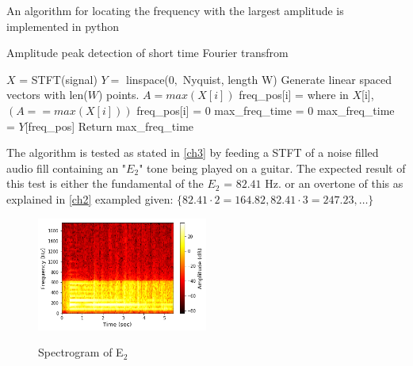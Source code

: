 An algorithm for locating the frequency with the largest amplitude  is implemented in python 
\begin{algorithm}[H]
\caption{Amplitude peak detection of short time Fourier transfrom}
\label{alg:FIR}
\begin{algorithmic}[1] 
\State  $X$ = STFT(signal) 
\State $Y =$ linspace($0,$ Nyquist, length W) \Comment Generate linear spaced vectors with len($W$) points.
		\State $A = max(X[i])$ 
		 
			\State freq\_pos[i] = where in $X$[i], $(A == max(X[i]))$ 
		\Else
			\State freq\_pos[i] = 0	
		\EndIf
			\State max\_freq\_time = 0
		\Else
			\State max\_freq\_time = $Y$[freq\_pos]
		\EndIf
	\EndFor
	\State Return max\_freq\_time
\EndProcedure
\end{algorithmic}
\end{algorithm}

The algorithm is tested as stated in \ref{ch3}  by feeding  a STFT of a noise filled audio fill containing an "$E_2$" tone being played on a guitar. 
The expected result of this test is either the fundamental of the $E_2$ = $82.41$ Hz. or an overtone of this as explained in \ref{ch2} exampled given: $\{82.41 \cdot 2 = 164.82, 82.41 \cdot 3 = 247.23, \dots \}$ 

\begin{figure}[H]
\centering 
\includegraphics[width=0.5\textwidth]{figures/peak_detection/20170511_spectogram_E_2.png}
\label{fig:spec_E_2}
\caption{Spectrogram of E$_2$}
\end{figure}


